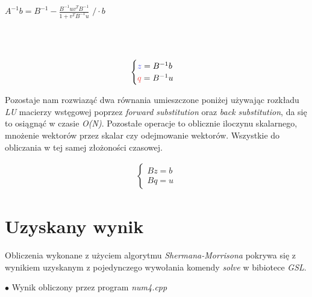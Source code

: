\documentclass{article}
\begin{document}
  \begin{center}
    {\large$A^{-1}b= B^{-1} - \frac{ B^{-1}uv^TB^{-1} }{ 1 + v^TB^{-1}u }$} \qquad $\slash \cdot b$   \\
     \\
     \\
     \\

  \[
  \begin{aligned}
      \begin{cases}
        \textcolor{blue}{z} = B^{-1}b \\
        \textcolor{red}{q} = B^{-1}u
      \end{cases}
  \end{aligned}
  \]
\end{center}
  Pozostaje nam rozwiaząć dwa równania umieszczone poniżej używając rozkładu \textit{LU} macierzy wstęgowej poprzez \textit{forward substitution} oraz \textit{back substitution}, da się to osiągnąć w czasie \textit{O(N)}. Pozostałe operacje to oblicznie iloczynu skalarnego, mnożenie wektorów przez skalar czy odejmowanie wektorów. Wszystkie do obliczania w tej samej złożoności czasowej. 
  \begin{center}
  \[
  \begin{aligned}
      \begin{cases}
          Bz = b \\
          Bq = u
      \end{cases}
  \end{aligned}
  \]

  \end{center}



  \section{Uzyskany wynik}
  Obliczenia wykonane z użyciem algorytmu \textit{Shermana-Morrisona} pokrywa się z wynikiem uzyskanym z pojedynczego wywołania komendy \textit{solve} w bibiotece \textit{GSL}.
    \begin{flushleft}
      $\bullet$ Wynik obliczony przez program \textit{num4.cpp}
    \end{flushleft}
\end{document}
